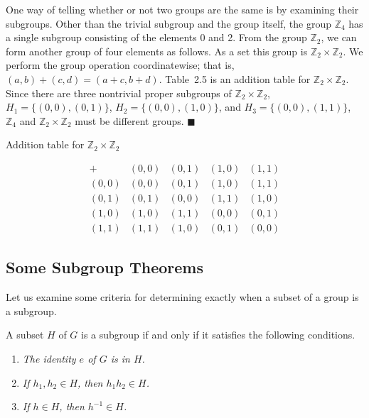  
\medskip
 
 
One way of telling whether or not two groups are the same is by
examining their subgroups.  Other than the trivial subgroup and the
group itself, the group ${\mathbb Z}_4$ has a single subgroup consisting
of the elements 0 and 2. From the group ${\mathbb Z}_2$, we can form
another group of four elements as follows.  As a set this group is
${\mathbb Z}_2 \times {\mathbb Z}_2$. We perform the group operation 
coordinatewise; that is, $(a,b) + (c,d) = (a+c, b+d)$. Table~2.5 is
an addition table for ${\mathbb Z}_2 \times {\mathbb Z}_2$. Since
there are three nontrivial proper subgroups of ${\mathbb Z}_2 \times
{\mathbb Z}_2$, $H_1 = \{ (0,0), (0,1) \}$, $H_2 = \{ (0,0), (1,0) \}$,
and $H_3 = \{ (0,0), (1,1) \}$, ${\mathbb Z}_4$ and ${\mathbb Z}_2 \times
{\mathbb Z}_2$ must be different groups.
\hspace{\fill} $\blacksquare$
 
 
\begin{table}[htb]\label{groups_table_5}
\caption{Addition table for ${\mathbb Z}_2 \times {\mathbb Z}_2$}{\small
$$
\begin{array}{c|cccc}
+     & (0,0) & (0,1) & (1,0) & (1,1) \\
\hline
(0,0) & (0,0) & (0,1) & (1,0) & (1,1) \\
(0,1) & (0,1) & (0,0) & (1,1) & (1,0) \\
(1,0) & (1,0) & (1,1) & (0,0) & (0,1) \\
(1,1) & (1,1) & (1,0) & (0,1) & (0,0)
\end{array}
$$
}
\end{table} 
 
 
\subsection*{Some Subgroup Theorems}
 
 
Let us examine some criteria for determining exactly when a subset of
a group is a subgroup.
 
 
\begin{proposition}
A subset $H$ of $G$ is a subgroup if and only if it satisfies the
following conditions. 
\begin{enumerate}
 
\rm \item \it 
The identity $e$ of $G$ is in $H$. 
 
\rm \item \it 
If $h_1, h_2 \in H$, then $h_1h_2 \in H$. 
 
\rm \item \it 
If $h \in H$, then $h^{-1} \in H$.
 
\end{enumerate}
\end{proposition}
 
